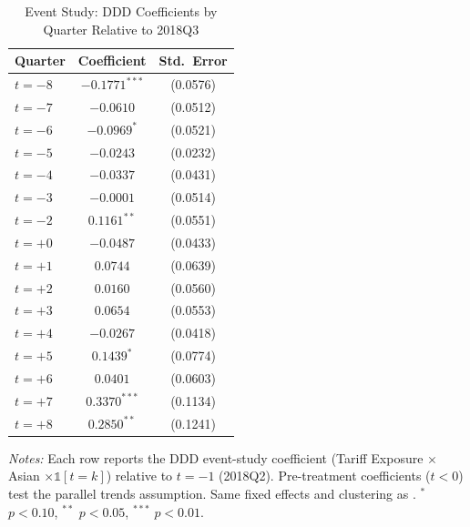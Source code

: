 \begin{table}[H]
\centering
\caption{Event Study: DDD Coefficients by Quarter Relative to 2018Q3}
\begin{threeparttable}
\begin{tabular}{lcc}
\toprule
Quarter & Coefficient & Std.\ Error \\
\midrule
$t = -8$ & $-0.1771^{***}$ & (0.0576) \\
$t = -7$ & $-0.0610$ & (0.0512) \\
$t = -6$ & $-0.0969^{*}$ & (0.0521) \\
$t = -5$ & $-0.0243$ & (0.0232) \\
$t = -4$ & $-0.0337$ & (0.0431) \\
$t = -3$ & $-0.0001$ & (0.0514) \\
$t = -2$ & $0.1161^{**}$ & (0.0551) \\
$t = +0$ & $-0.0487$ & (0.0433) \\
$t = +1$ & $0.0744$ & (0.0639) \\
$t = +2$ & $0.0160$ & (0.0560) \\
$t = +3$ & $0.0654$ & (0.0553) \\
$t = +4$ & $-0.0267$ & (0.0418) \\
$t = +5$ & $0.1439^{*}$ & (0.0774) \\
$t = +6$ & $0.0401$ & (0.0603) \\
$t = +7$ & $0.3370^{***}$ & (0.1134) \\
$t = +8$ & $0.2850^{**}$ & (0.1241) \\
\bottomrule
\end{tabular}
\begin{tablenotes}[flushleft]
\small
\item \textit{Notes:} Each row reports the DDD event-study coefficient (Tariff Exposure $\times$ Asian $\times \mathbb{1}[t = k]$) relative to $t = -1$ (2018Q2). Pre-treatment coefficients ($t < 0$) test the parallel trends assumption. Same fixed effects and clustering as . $^{*}$ $p<0.10$, $^{**}$ $p<0.05$, $^{***}$ $p<0.01$.
\end{tablenotes}
\end{threeparttable}
\label{tab:eventstudy}
\end{table}

